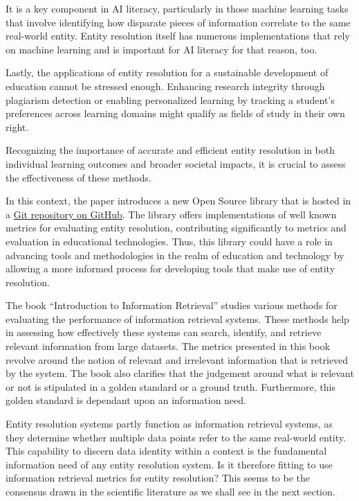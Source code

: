 \documentclass[a4paper,twoside]{article}
\begin{document}
    It is a key component in AI literacy, particularly in those machine learning
    tasks that involve identifying how disparate pieces of information correlate
    to the same real-world entity.
    Entity resolution itself has numerous implementations that rely on machine
    learning and is important for AI literacy for that reason,
    too\cite{deepm2020}.
    
    Lastly, the applications of entity resolution for a sustainable development
    of education cannot be stressed enough.
    Enhancing research integrity through plagiarism detection or enabling
    personalized learning by tracking a student's preferences across learning
    domains might qualify as fields of study in their own right.

    Recognizing the importance of accurate and efficient entity resolution in
    both individual learning outcomes and broader societal impacts, it is
    crucial to assess the effectiveness of these methods.
    
    In this context, the paper introduces a new Open Source library that is
    hosted in a \href{https://github.com/matchescu/py-resolve-metrics}{Git
    repository on GitHub}\cite{matchescu-er-metrics2023}.
    The library offers implementations of well known metrics for evaluating
    entity resolution, contributing significantly to metrics and evaluation in
    educational technologies.
    Thus, this library could have a role in advancing tools and methodologies in
    the realm of education and technology by allowing a more informed process
    for developing tools that make use of entity resolution.

    The book ``Introduction to Information Retrieval'' studies various methods
    for evaluating the performance of information retrieval
    systems\cite{manning2008}.
    These methods help in assessing how effectively these systems can search,
    identify, and retrieve relevant information from large datasets.
    The metrics presented in this book revolve around the notion of relevant and
    irrelevant information that is retrieved by the system.
    The book also clarifies that the judgement around what is relevant or not is
    stipulated in a golden standard or a ground truth.
    Furthermore, this golden standard is dependant upon an information need.

    Entity resolution systems partly function as information retrieval systems,
    as they determine whether multiple data points refer to the same real-world
    entity.
    This capability to discern data identity within a context is the fundamental
    information need of any entity resolution system.
    Is it therefore fitting to use information retrieval metrics for entity
    resolution?
    This seems to be the consensus drawn in the scientific literature as we
    shall see in the next section.
\end{document}
